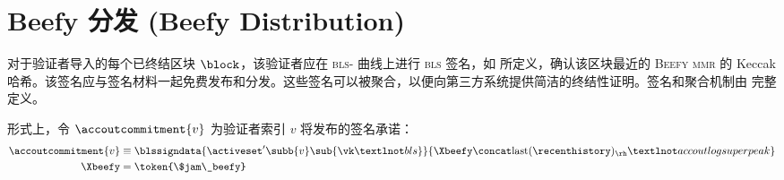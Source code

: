 \section{Beefy 分发 (Beefy Distribution)}
\label{sec:beefy}

对于验证者导入的每个已终结区块 $\block$，该验证者应在 \textsc{bls}- 曲线上进行 \textsc{bls} 签名，如 \cite{bls12-381} 所定义，确认该区块最近的 \textsc{Beefy} \textsc{mmr} 的 Keccak 哈希。该签名应与签名材料一起免费发布和分发。这些签名可以被聚合，以便向第三方系统提供简洁的终结性证明。签名和聚合机制由 \cite{cryptoeprint:2022/1611} 完整定义。

形式上，令 $\accoutcommitment{v}$ 为验证者索引 $v$ 将发布的签名承诺：
\begin{align}\label{eq:accoutsignedcommitment}
  \accoutcommitment{v} &\equiv \blssigndata{\activeset'\subb{v}\sub{\vk¬bls}}{\Xbeefy \concat \text{last}(\recenthistory)_\rh¬accoutlogsuperpeak}\\
  \Xbeefy &= \token{\$jam\_beefy}
\end{align}
